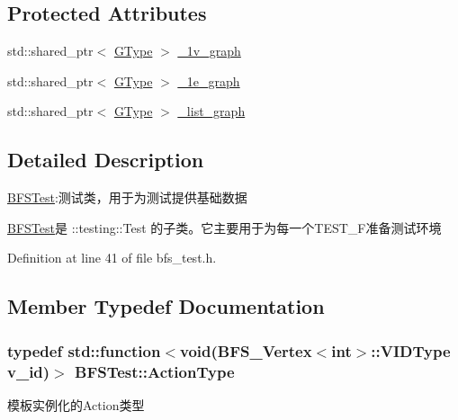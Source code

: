 \subsection*{Protected Attributes}
\begin{DoxyCompactItemize}
\item 
std\+::shared\+\_\+ptr$<$ \hyperlink{class_b_f_s_test_ad38ca5029d5674d467dc71d13f5e5c7c}{G\+Type} $>$ \hyperlink{class_b_f_s_test_a0d7cdb7946902c8d93945a35a222b9d7}{\+\_\+1v\+\_\+graph}
\item 
std\+::shared\+\_\+ptr$<$ \hyperlink{class_b_f_s_test_ad38ca5029d5674d467dc71d13f5e5c7c}{G\+Type} $>$ \hyperlink{class_b_f_s_test_a0158014634e67e6bee3f8f6b1e622ced}{\+\_\+1e\+\_\+graph}
\item 
std\+::shared\+\_\+ptr$<$ \hyperlink{class_b_f_s_test_ad38ca5029d5674d467dc71d13f5e5c7c}{G\+Type} $>$ \hyperlink{class_b_f_s_test_aacf800be44976478c190b2acd338377f}{\+\_\+list\+\_\+graph}
\end{DoxyCompactItemize}


\subsection{Detailed Description}
\hyperlink{class_b_f_s_test}{B\+F\+S\+Test}\+:测试类，用于为测试提供基础数据 

{\ttfamily \hyperlink{class_b_f_s_test}{B\+F\+S\+Test}}是 {\ttfamily \+::testing\+::\+Test} 的子类。它主要用于为每一个{\ttfamily T\+E\+S\+T\+\_\+\+F}准备测试环境 

Definition at line 41 of file bfs\+\_\+test.\+h.



\subsection{Member Typedef Documentation}
\hypertarget{class_b_f_s_test_a4012e860a3e78030ef0f4f544a834177}{}
\subsubsection[{Action\+Type}]{\setlength{\rightskip}{0pt plus 5cm}typedef std\+::function$<$void({\bf B\+F\+S\+\_\+\+Vertex}$<$int$>$\+::V\+I\+D\+Type v\+\_\+id)$>$ {\bf B\+F\+S\+Test\+::\+Action\+Type}}\label{class_b_f_s_test_a4012e860a3e78030ef0f4f544a834177}
模板实例化的\+Action类型 

